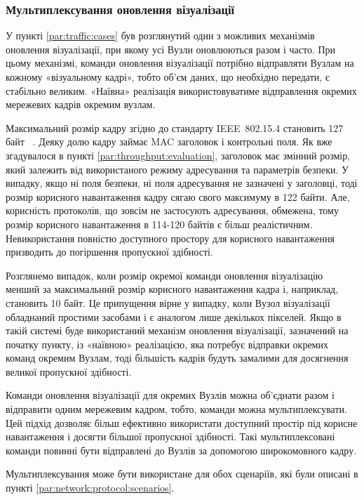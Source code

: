 \documentclass[a4paper,ukrainian,utf8,nocolumnsxix,floatsection]{eskdtext}
\renewcommand\paragraph{\subsubsection}
\newcommand{\iee}[0]{IEEE~802.15.4\xspace}
\begin{document}
\paragraph{Мультиплексування оновлення візуалізації}

У пункті \ref{par:traffic:cases} був розглянутий один з можливих механізмів оновлення візуалізації, при якому усі Вузли оновлюються разом і часто. При цьому механізмі, команди оновлення візуалізації  потрібно відправляти Вузлам на кожному «візуальному кадрі», тобто об’єм даних, що необхідно передати, є стабільно великим. «Наївна» реалізація використовуватиме відправлення окремих мережевих кадрів окремим вузлам.

Максимальний розмір кадру згідно до стандарту \iee становить 127 байт ~\cite{ieee:802:15:4:2011}. Деяку долю кадру займає MAC заголовок і контрольні поля. Як вже згадувалося в пункті \ref{par:throughput:evaluation}, заголовок має змінний розмір, який залежить від використаного режиму адресування та параметрів безпеки. У випадку, якщо ні поля безпеки, ні поля адресування не зазначені у заголовці, тоді розмір корисного навантаження кадру сягаю свого максимуму в 122 байти. Але, корисність протоколів, що зовсім не застосують адресування, обмежена, тому розмір корисного навантаження в 114-120 байтів є більш реалістичним. Невикористання повністю доступного простору для корисного навантаження призводить до погіршення пропускної здібності.

Розглянемо випадок, коли розмір окремої команди оновлення візуалізацію менший за максимальний розмір корисного навантаження кадра і, наприклад, становить 10 байт. Це припущення вірне у випадку, коли Вузол візуалізації обладнаний простими засобами і є аналогом лише декількох пікселей. Якщо в такій системі буде використаний механізм оновлення візуалізації, зазначений на початку пункту, із «наївною» реалізацією, яка потребує відправки окремих команд окремим Вузлам, тоді більшість кадрів будуть замалими для досягнення великої пропускної здібності.

Команди оновлення візуалізації для окремих Вузлів можна об’єднати разом і відправити одним мережевим кадром, тобто, команди можна мультиплексувати. Цей підхід дозволяє більш ефективно використати доступний простір під корисне навантаження і досягти більшої пропускної здібності. Такі мультиплексовані команди повинні бути відправлені до Вузлів за допомогою широкомовного кадру.

Мультиплексування може бути використане для обох сценаріїв, які були описані в пункті \ref{par:network:protocol:scenarios}.
\end{document}
